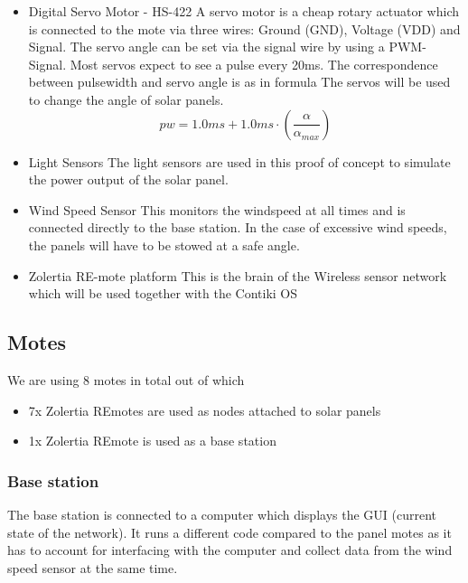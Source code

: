 \documentclass[conference]{IEEEtran}
\begin{document}
\begin{itemize}
    \item Digital Servo Motor - HS-422\cite{servoMotor}\newline
        A servo motor is a cheap rotary actuator which is connected to the mote via three wires: Ground (GND), Voltage (VDD) and Signal. The servo angle can be set via the signal wire by using a PWM-Signal. Most servos expect to see a pulse every 20ms. The correspondence between pulsewidth and servo angle is as in formula The servos will be used to change the angle of solar panels.
\begin{equation}\label{eq:Servo_PWM}
pw = 1.0ms + 1.0ms \cdot (\frac{\alpha}{\alpha_{max}})
\end{equation}
        
        
    \item Light Sensors\cite{LightSensor}\newline
        The light sensors are used in this proof of concept to simulate the power output of the solar panel.
    \item Wind Speed Sensor\cite{WindSensor}\newline
        This monitors the windspeed at all times and is connected directly to the base station. In the case of excessive wind speeds, the panels will have to be stowed at a safe angle.
    \item Zolertia RE-mote platform\cite{REmote}\newline
        This is the brain of the Wireless sensor network which will be used together with the Contiki OS

\end{itemize}

\subsection{Motes}
We are using 8 motes in total out of which
\begin{itemize}
    \item 7x Zolertia REmotes are used as nodes attached to solar panels
    \item 1x Zolertia REmote is used as a base station
\end{itemize}

\subsubsection{Base station}
    The base station is connected to a computer which displays the GUI (current state of the network). It runs a different code compared to the panel motes as it has to account for interfacing with the computer and collect data from the wind speed sensor at the same time.
\end{document}
